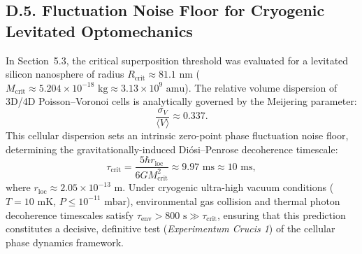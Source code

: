 \subsection*{D.5. Fluctuation Noise Floor for Cryogenic Levitated Optomechanics}
In Section~5.3, the critical superposition threshold was evaluated for a levitated silicon nanosphere of radius $R_{\text{crit}} \approx 81.1\text{ nm}$ ($M_{\text{crit}} \approx 5.204 \times 10^{-18}\text{ kg} \approx 3.13 \times 10^9\text{ amu}$). The relative volume dispersion of 3D/4D Poisson--Voronoi cells is analytically governed by the Meijering parameter:
\begin{equation}\label{eq:D.8}\tag{D.8}
\frac{\sigma_V}{\langle V \rangle} \approx 0.337.
\end{equation}
This cellular dispersion sets an intrinsic zero-point phase fluctuation noise floor, determining the gravitationally-induced Di\'osi--Penrose decoherence timescale:
\begin{equation}\label{eq:D.9}\tag{D.9}
\tau_{\text{crit}} = \frac{5\hbar r_{\text{loc}}}{6 G M_{\text{crit}}^2} \approx 9.97\text{ ms} \approx 10\text{ ms},
\end{equation}
where $r_{\text{loc}} \approx 2.05 \times 10^{-13}\text{ m}$. Under cryogenic ultra-high vacuum conditions ($T = 10\text{ mK}$, $P \le 10^{-11}\text{ mbar}$), environmental gas collision and thermal photon decoherence timescales satisfy $\tau_{\text{env}} > 800\text{ s} \gg \tau_{\text{crit}}$, ensuring that this prediction constitutes a decisive, definitive test (\textit{Experimentum Crucis 1}) of the cellular phase dynamics framework.


